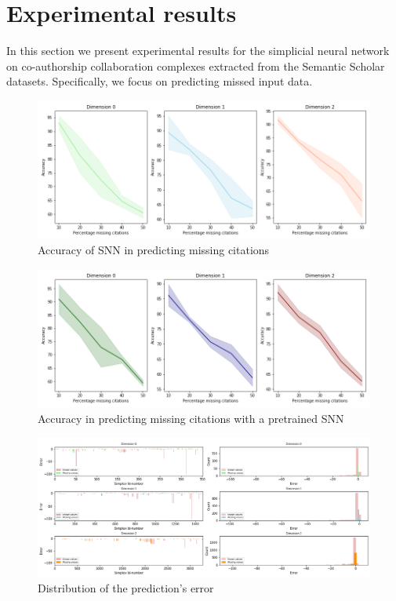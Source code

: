 \section{Experimental results}
In this section we present experimental results for the simplicial neural network on co-authorship collaboration complexes extracted from the Semantic Scholar datasets. Specifically, we focus on predicting missed input data.


\begin{figure}[htbp]

  \centering

\includegraphics[scale=0.4]{./figures/accuracy_network1.png}
 \caption{Accuracy of SNN in predicting missing citations } \label{fig:accuracy}

\end{figure}

\begin{figure}[htbp]
  \centering
  
\includegraphics[scale=0.4]{./figures/accuracy_network1_pretrained.png}
  \caption{Accuracy in predicting missing citations with a pretrained SNN} \label{fig:error}
\end{figure}

\begin{figure}[htbp]

  \centering
 \hspace{-6cm}
 
\includegraphics[scale=0.4]{./figures/Error_start150250_seed6666_notsee30.png}
  \caption{Distribution of the prediction's error} \label{fig:error}
\end{figure}

